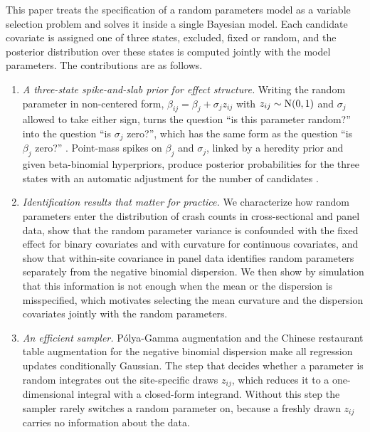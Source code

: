 This paper treats the specification of a random parameters model as a variable selection problem and solves it inside a single Bayesian model. Each candidate covariate is assigned one of three states, excluded, fixed or random, and the posterior distribution over these states is computed jointly with the model parameters. The contributions are as follows.
\begin{enumerate}[label=(\roman*),leftmargin=*]
\item \emph{A three-state spike-and-slab prior for effect structure.} Writing the random parameter in non-centered form, $\beta_{ij}=\beta_j+\sigma_j z_{ij}$ with $z_{ij}\sim\mathrm{N}(0,1)$ and $\sigma_j$ allowed to take either sign, turns the question ``is this parameter random?'' into the question ``is $\sigma_j$ zero?'', which has the same form as the question ``is $\beta_j$ zero?'' \citep{fruhwirth2010stochastic}. Point-mass spikes on $\beta_j$ and $\sigma_j$, linked by a heredity prior and given beta-binomial hyperpriors, produce posterior probabilities for the three states with an automatic adjustment for the number of candidates \citep{scott2010bayes}.
\item \emph{Identification results that matter for practice.} We characterize how random parameters enter the distribution of crash counts in cross-sectional and panel data, show that the random parameter variance is confounded with the fixed effect for binary covariates and with curvature for continuous covariates, and show that within-site covariance in panel data identifies random parameters separately from the negative binomial dispersion. We then show by simulation that this information is not enough when the mean or the dispersion is misspecified, which motivates selecting the mean curvature and the dispersion covariates jointly with the random parameters.
\item \emph{An efficient sampler.} P\'olya-Gamma augmentation \citep{polson2013bayesian} and the Chinese restaurant table augmentation for the negative binomial dispersion \citep{zhou2015negative} make all regression updates conditionally Gaussian. The step that decides whether a parameter is random integrates out the site-specific draws $z_{ij}$, which reduces it to a one-dimensional integral with a closed-form integrand. Without this step the sampler rarely switches a random parameter on, because a freshly drawn $z_{ij}$ carries no information about the data.

\end{enumerate}

